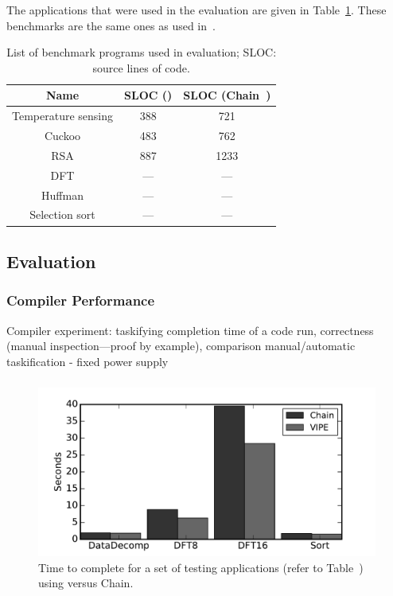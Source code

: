 The applications that were used in the evaluation are given in Table~\ref{table:benchmark_list}. These benchmarks are the same ones as used in~\cite{chain,alpaca}.

\begin{table}
	\begin{tabular}{|c|c|c|}
		\hline
		Name & SLOC (\sys) & SLOC (Chain~\cite{chain})\\
		\hline\hline
		Temperature sensing & 388 & 721 \\ %
		Cuckoo & 483 & 762 \\ %
		RSA & 887 & 1233 \\ %
		DFT & --- & --- \\ %
		Huffman & --- & --- \\ %
		Selection sort & --- & --- \\
		\hline
	\end{tabular}
\caption{List of benchmark programs used in \sys evaluation; SLOC: source lines of code.}
\label{table:benchmark_list}
\end{table}

\subsection{Evaluation}
\label{sec:results_evaluation}

\subsubsection{Compiler Performance}
\label{sec:results_compiler}

Compiler experiment: taskifying completion time of a code run, correctness (manual inspection---proof by example), comparison manual/automatic taskification - fixed power supply


\subsubsection{}
\label{sec:}

\begin{figure}
	\centering
	\includegraphics[width=\columnwidth]{figures/chain_vipe}
	\caption{Time to complete for a set of testing applications (refer to Table~\cite{table:benchmark_list}) using \sys versus Chain.}
	\label{fig:IPOSPerformance}
\end{figure}


